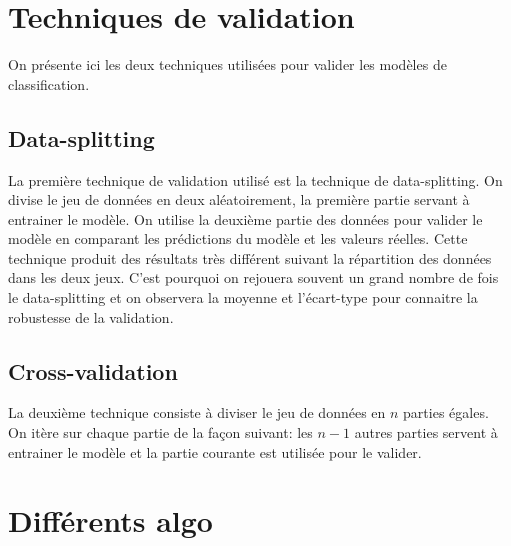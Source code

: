 \documentclass[11pt,a4paper]{article}
\begin{document}
\section{Techniques de validation}

	On présente ici les deux techniques utilisées pour valider les modèles de classification.

	\subsection{Data-splitting}		
		La première technique de validation utilisé est la technique de data-splitting. On divise le jeu de données en deux aléatoirement, la première partie servant à entrainer le modèle. On utilise la deuxième partie des données pour valider le modèle en comparant les prédictions du modèle et les valeurs réelles.
		Cette technique produit des résultats très différent suivant la répartition des données dans les deux jeux. C'est pourquoi on rejouera souvent un grand nombre de fois le data-splitting et on observera la moyenne et l'écart-type pour connaitre la robustesse de la validation.

	\subsection{Cross-validation}

		La deuxième technique consiste à diviser le jeu de données en $n$ parties égales. On itère sur chaque partie de la façon suivant: les $n-1$ autres parties servent à entrainer le modèle et la partie courante est utilisée pour le valider. 

\section{Différents algo}
\end{document}
